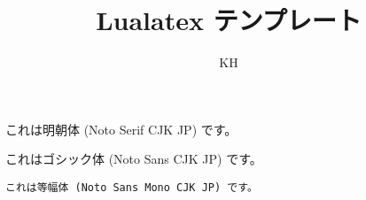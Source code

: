\documentclass[a4paper,12pt]{jlreq}
\title{Lualatex テンプレート}
\author{KH}
\date{}
\begin{document}
\maketitle
これは明朝体 (Noto Serif CJK JP) です。

\textsf{これはゴシック体 (Noto Sans CJK JP) です。}

\texttt{これは等幅体 (Noto Sans Mono CJK JP) です。}
\end{document}
